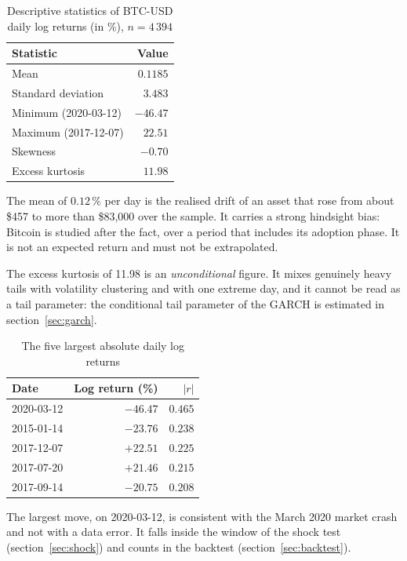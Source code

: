 \documentclass[12pt,a4paper]{article}
\begin{document}
\begin{table}[H]
	\centering
	\caption{Descriptive statistics of BTC-USD daily log returns (in \%), $n = 4\,394$}
	\label{tab:data-desc}
	\begin{tabular}{lr}
		\toprule
		Statistic & Value \\
		\midrule
		Mean & $0.1185$ \\
		Standard deviation & $3.483$ \\
		Minimum (2020-03-12) & $-46.47$ \\
		Maximum (2017-12-07) & $22.51$ \\
		Skewness & $-0.70$ \\
		Excess kurtosis & $11.98$ \\
		\bottomrule
	\end{tabular}
\end{table}

The mean of $0.12\,\%$ per day is the realised drift of an asset that rose from about \$457 to more than \$83,000 over the sample. It carries a strong hindsight bias: Bitcoin is studied after the fact, over a period that includes its adoption phase. It is not an expected return and must not be extrapolated.

The excess kurtosis of 11.98 is an \emph{unconditional} figure. It mixes genuinely heavy tails with volatility clustering and with one extreme day, and it cannot be read as a tail parameter: the conditional tail parameter of the GARCH is estimated in section~\ref{sec:garch}.

\begin{table}[H]
	\centering
	\caption{The five largest absolute daily log returns}
	\label{tab:data-top5}
	\begin{tabular}{lrr}
		\toprule
		Date & Log return (\%) & $|r|$ \\
		\midrule
		2020-03-12 & $-46.47$ & $0.465$ \\
		2015-01-14 & $-23.76$ & $0.238$ \\
		2017-12-07 & $+22.51$ & $0.225$ \\
		2017-07-20 & $+21.46$ & $0.215$ \\
		2017-09-14 & $-20.75$ & $0.208$ \\
		\bottomrule
	\end{tabular}
\end{table}

The largest move, on 2020-03-12, is consistent with the March 2020 market crash and not with a data error. It falls inside the window of the shock test (section~\ref{sec:shock}) and counts in the backtest (section~\ref{sec:backtest}).
\end{document}
